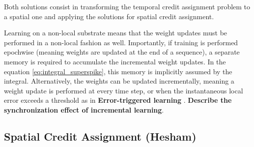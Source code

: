 \documentclass[journal,onecolumn,11pt]{IEEEtran}
\begin{document}
Both solutions consist in transforming the temporal credit assignment problem to a spatial one and applying the solutions for spatial credit assignment.

Learning on a non-local substrate means that the weight updates must be performed in a non-local fashion as well. Importantly, if training is performed epochwise (meaning weights are updated at the end of a sequence), a separate memory is required to accumulate the incremental weight updates. In the equation \ref{eq:integral_superspike}, this memory is implicitly assumed by the integral. Alternatively, the weights can be updated incrementally, meaning a weight update is performed at every time step, or when the instantaneous local error exceeds a threshold as in 
\textbf{Error-triggered learning} \cite{Neftci18_datapowe}.
\textbf{Describe the synchronization effect of incremental learning}.


\subsection{Spatial Credit Assignment (Hesham)}
\label{sec:spatial_credit_assignment}
\end{document}
